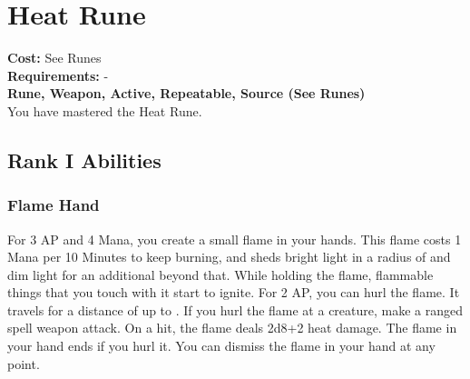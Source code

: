 \section{Heat Rune}\label{rune:heat}
\textbf{Cost:} See Runes\\
\textbf{Requirements:} -\\
\textbf{Rune, Weapon, Active, Repeatable, Source (See Runes)}\\
You have mastered the Heat Rune.

\subsection{Rank I Abilities}

\subsubsection{Flame Hand}
For 3 AP and 4 Mana, you create a small flame in your hands.
This flame costs 1 Mana per 10 Minutes to keep burning, and sheds bright light in a radius of  and dim light for an additional  beyond that.
While holding the flame, flammable things that you touch with it start to ignite.
For 2 AP, you can hurl the flame.
It travels for a distance of up to .
If you hurl the flame at a creature, make a ranged spell weapon attack.
On a hit, the flame deals 2d8+2 heat damage.
The flame in your hand ends if you hurl it.
You can dismiss the flame in your hand at any point.